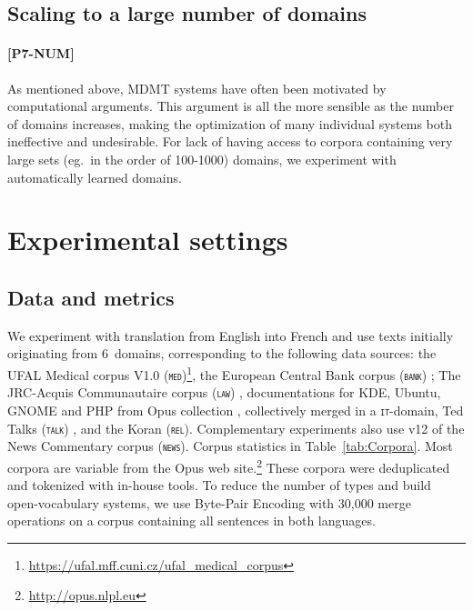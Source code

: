 \documentclass[11pt,a4paper]{article}
\newcommand{\fyFuture}[1]{\done[FY]\Todo[FY:]{\textcolor{red}{#1}}}
\newcommand{\domain}[1]{\texttt{\textsc{#1}}}
\begin{document}
\subsection{Scaling to a large number of domains \label{ssec:scaling}}

\paragraph{[P7-NUM]} As mentioned above, MDMT systems have often been motivated by computational arguments. This argument is all the more sensible as the number of domains increases, making the optimization of many individual systems both ineffective and undesirable. For lack of having access to corpora containing very large sets (eg.\ in the order of 100-1000) domains, we experiment with automatically learned domains.\fyFuture{considering a varying number of clusters.}

\section{Experimental settings \label{sec:experiments}}

\subsection{Data and metrics \label{ssec:corpora}}

We experiment with translation from English into French and use texts initially originating from 6~domains, corresponding to the following data sources: the UFAL Medical corpus V1.0 (\domain{med})\footnote{\url{https://ufal.mff.cuni.cz/ufal_medical_corpus}}, the European Central Bank corpus (\domain{bank}) \cite{Tiedemann12parallel}; The JRC-Acquis Communautaire corpus (\domain{law}) \cite{Steinberger06acquis}, documentations for KDE, Ubuntu, GNOME and PHP from Opus collection \cite{Tiedemann09news}, collectively merged in a \domain{it}-domain, Ted Talks (\domain{talk}) \cite{Cettolo12wit}, and the Koran (\domain{rel}). Complementary experiments also use v12 of the News Commentary corpus (\domain{news}). Corpus statistics in Table~\ref{tab:Corpora}.  Most corpora are variable from the Opus web site.\footnote{\url{http://opus.nlpl.eu}} These corpora were deduplicated and tokenized with in-house tools. To reduce the number of types and build open-vocabulary systems, we use Byte-Pair Encoding \cite{Sennrich16BPE} with 30,000 merge operations on a corpus containing all sentences in both languages.%
\end{document}
